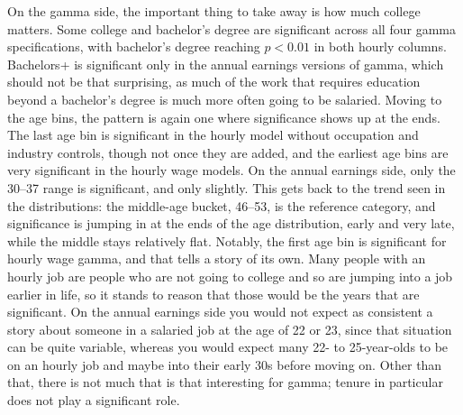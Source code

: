 \documentclass[12pt]{article}
\begin{document}
\begin{onehalfspace}
\begin{table}[H]
    \centering
    \caption{Gamma and Alpha Regressions: OLS Results (Coefficients x 100)}
    \label{tab:gamma_alpha_ols}
    \resizebox{\textwidth}{!}{%
        
    }
\end{table}


On the gamma side, the important thing to take away is how much college matters. Some college and bachelor's degree are significant across all four gamma specifications, with bachelor's degree reaching $p<0.01$ in both hourly columns. Bachelors+ is significant only in the annual earnings versions of gamma, which should not be that surprising, as much of the work that requires education beyond a bachelor's degree is much more often going to be salaried. Moving to the age bins, the pattern is again one where significance shows up at the ends. The last age bin is significant in the hourly model without occupation and industry controls, though not once they are added, and the earliest age bins are very significant in the hourly wage models. On the annual earnings side, only the 30--37 range is significant, and only slightly. This gets back to the trend seen in the distributions: the middle-age bucket, 46--53, is the reference category, and significance is jumping in at the ends of the age distribution, early and very late, while the middle stays relatively flat. Notably, the first age bin is significant for hourly wage gamma, and that tells a story of its own. Many people with an hourly job are people who are not going to college and so are jumping into a job earlier in life, so it stands to reason that those would be the years that are significant. On the annual earnings side you would not expect as consistent a story about someone in a salaried job at the age of 22 or 23, since that situation can be quite variable, whereas you would expect many 22- to 25-year-olds to be on an hourly job and maybe into their early 30s before moving on. Other than that, there is not much that is that interesting for gamma; tenure in particular does not play a significant role.


\end{onehalfspace}
\end{document}
